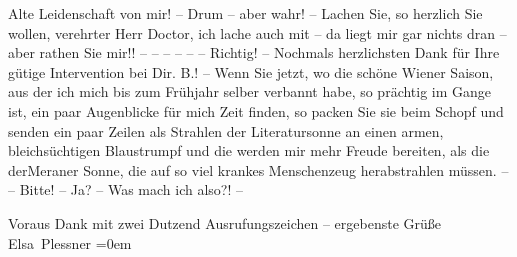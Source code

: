               Alte Leidenschaft von mir! – Drum – aber wahr! – Lachen Sie, so herzlich Sie wollen,
               verehrter Herr Doctor, ich lache auch mit – da liegt mir gar nichts dran – aber
               rathen Sie mir!! – – – – – – Richtig! – Nochmals herzlichsten Dank für Ihre gütige
               Intervention bei Dir. B.! – Wenn Sie jetzt, wo
               die schöne Wiener Saison, aus der ich mich bis zum
                  Frühjahr selber verbannt habe, so prächtig im Gange ist, ein paar
               Augenblicke für mich Zeit finden, so packen Sie sie beim Schopf und senden ein paar
               Zeilen als Strahlen der Literatursonne an eine\introOben{}n\introOben{} armen, bleichsüchtigen Blaustrumpf
               und die werden mir mehr Freude bereiten, als die \introOben{}der\introOben{}{ }Meraner Sonne, die auf so viel krankes
               Menschenzeug herabstrahlen müssen. – – Bitte! – Ja? – Was mach ich also?! –\pend
           
\pstart
           Voraus Dank mit zwei Dutzend Ausrufungszeichen – ergebenste Grüße{\\[\baselineskip]}\spacefill\mbox{Elsa Plessner}\pend
           \leftskip=0em{}\endnumbering{}  \newcommand{\dateiname}{L03708}\newcommand{\titel}{Elsa Plessner an Arthur Schnitzler, 1. 12. 1896}\newcommand{\editorInnen}{Selma Jahnke und Martin Anton Müller}
